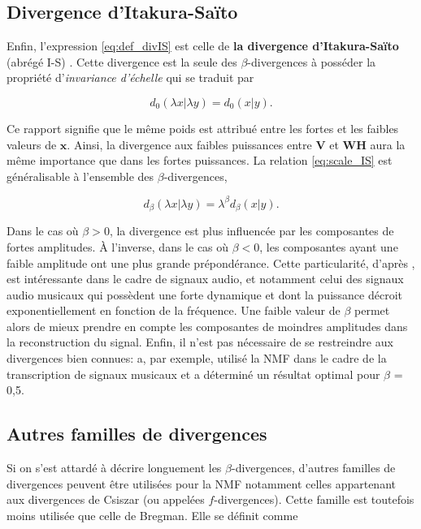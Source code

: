 \subsection{Divergence d'Itakura-Saïto}
Enfin, l'expression \ref{eq:def_divIS} est celle de \textbf{la divergence d'Itakura-Saïto} (abrégé I-S) \cite{itakura1968analysis, bertin_les_2009}. Cette divergence est la seule des $\beta$-divergences à posséder la propriété d'\textit{invariance d'échelle} qui se traduit par

\begin{equation}\label{eq:scale_IS}
d_{0}(\lambda x \vert \lambda y) = d_{0}(x \vert y).
\end{equation}

Ce rapport signifie que le même poids est attribué entre les fortes et les faibles valeurs de $\mathbf{x}$. Ainsi, la divergence aux faibles puissances entre $\textbf{V}$ et $\textbf{WH}$ aura la même importance que dans les fortes puissances. La relation \ref{eq:scale_IS} est généralisable à l'ensemble des $\beta$-divergences,

\begin{equation}
d_{\beta}(\lambda x \vert \lambda y) = \lambda^{\beta}d_{\beta}(x \vert y).
\end{equation}


Dans le cas où $\beta > 0$, la divergence est plus influencée par les composantes de fortes amplitudes. À l'inverse, dans le cas où $\beta < 0$, les composantes ayant une faible amplitude ont une plus grande prépondérance. Cette particularité, d'après \cite{fevotte_nonnegative_2009}, est intéressante dans le cadre de signaux audio, et notamment celui des signaux audio musicaux qui possèdent une forte dynamique et dont la puissance décroit exponentiellement en fonction de la fréquence. Une faible valeur de $\beta$ permet alors de mieux prendre en compte les composantes de moindres amplitudes dans la reconstruction du signal. Enfin, il n'est pas nécessaire de se restreindre aux divergences bien connues:  \cite{vincent2010adaptive} a, par exemple,  utilisé la NMF dans le cadre de la transcription de signaux musicaux et a déterminé un résultat optimal pour $\beta$ = 0,5. \\

\subsection{Autres familles de divergences}
Si on s'est attardé à décrire longuement les $\beta$-divergences, d'autres familles de divergences peuvent être utilisées pour la NMF notamment celles appartenant aux divergences de Csiszar (ou appelées $f$-divergences). Cette famille est toutefois moins utilisée que celle de Bregman. Elle se définit comme

